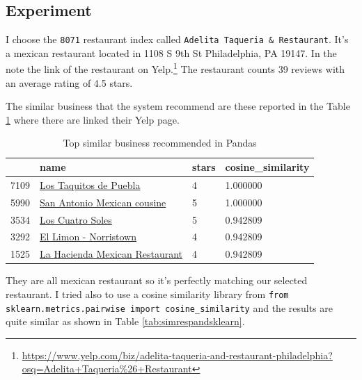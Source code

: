 \documentclass[12pt,english]{report}
\begin{document}
\subsection{Experiment}
I choose the \texttt{8071} restaurant index called \texttt{Adelita Taqueria \& Restaurant}.
It's a mexican restaurant located in 1108 S 9th St Philadelphia, PA 19147. In the note the link of the restaurant on Yelp.\footnote{\url{https://www.yelp.com/biz/adelita-taqueria-and-restaurant-philadelphia?osq=Adelita+Taqueria\%26+Restaurant}}
The restaurant counts 39 reviews with an average rating of 4.5 stars.\par
The similar business that the system recommend are these reported in the Table \ref{tab:simrespand} where there are linked their Yelp page.
\begin{table}[]
\caption{Top similar business recommended in Pandas}
\label{tab:simrespand}
\begin{tabular}{|l|l|l|l|}
\hline
     & name                           & stars & cosine\_similarity \\ \hline
7109 & \href{https://www.yelp.com/biz/los-taquitos-de-puebla-philadelphia-4?osq=Los+Taquitos+de+Puebla}{Los Taquitos de Puebla}         & 4     & 1.000000           \\ \hline
5990 & \href{https://www.yelp.com/biz/san-antonio-mexican-cousine-hatfield?osq=San+Antonio+Mexican+cousine}{San Antonio Mexican cousine}    & 5     & 1.000000           \\ \hline
3534 & \href{https://www.yelp.com/biz/los-cuatro-soles-philadelphia?osq=Los+Cuatro+Soles}{Los Cuatro Soles}              & 5     & 0.942809           \\ \hline
3292 & \href{https://www.yelp.com/biz/ecowas-african-restaurant-philadelphia-2}{El Limon - Norristown}          & 4     & 0.942809           \\ \hline
1525 & \href{https://www.yelp.com/biz/la-hacienda-mexican-restaurant-bensalem?osq=La+Hacienda+Mexican+Restaurant}{La Hacienda Mexican Restaurant} & 4     & 0.942809           \\ \hline
\end{tabular}
\end{table}
They are all mexican restaurant so it's perfectly matching our selected restaurant.
I tried also to use a cosine similarity library from \texttt{from sklearn.metrics.pairwise import cosine\_similarity} and the results are quite similar as shown in Table \ref{tab:simrespandsklearn}.
\end{document}

